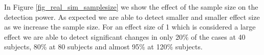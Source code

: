\documentclass[authoryear]{elsarticle}
\begin{document}
% 
% 
% 
% 

In Figure \ref{fig_real_sim_samplesize} we show the effect of the sample size on the detection power. As expected we are able to detect smaller and smaller effect size as we increase the sample size. For an effect size of 1 which is considered a large effect we are able to detect significant changes in only 20\% of the cases at 40 subjects, 80\% at 80 subjects and almost 95\% at 120\% subjects.
\end{document}
